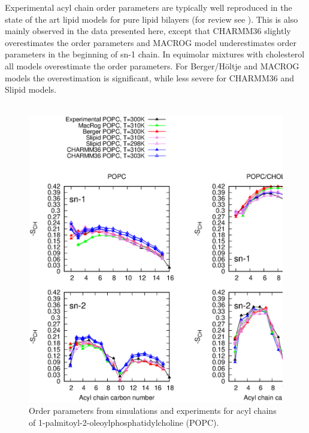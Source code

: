 \documentclass[aps,prl,superscriptaddress,twocolumn]{revtex4}
\begin{document}
Experimental acyl chain order parameters are typically well reproduced in the state of the art lipid models
for pure lipid bilayers (for review see \cite{ollila16}). This is also mainly observed in the data
presented here, except that CHARMM36 slightly overestimates the order parameters and MACROG model
underestimates order parameters in the beginning of sn-1 chain. In equimolar mixtures with cholesterol
all models overestimate the order parameters. For Berger/H\"oltje and MACROG models the overestimation is significant,
while less severe for CHARMM36 and Slipid models.\\
 \\
\begin{figure}[]
  \centering
  \includegraphics[width=17.2cm]{../FIGS/OrderParametersCHOL.eps}
  \caption{\label{OrderParametersCHOL}
    Order parameters from simulations and experiments for acyl chains of  1-palmitoyl-2-oleoylphosphatidylcholine (POPC).
  }
\end{figure}
\end{document}
